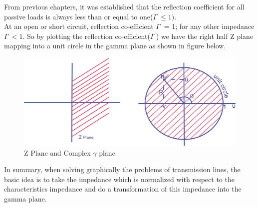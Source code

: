 From previous chapters, it was established that the reflection coefficient for all passive loads is always less than or equal to one($ \Gamma\ \leq 1).$\\
At an open or short circuit, reflection co-efficient $ \Gamma\ $ = 1; for any other impedance $ \Gamma\  < 1$.  So by plotting the reflection co-efficient($ \Gamma\ $) we have the right half Z plane mapping into a unit circle in the gamma plane as shown in figure below.
\begin{figure}[h]
\centering
\includegraphics[width=0.7\linewidth]{./graphics/oiuhgvcx}
\caption{Z Plane and Complex $\gamma$ plane}
\label{fig:oiuhgvcx}
\end{figure}

In summary, when solving graphically the problems of transmission lines, the basic idea is to take the impedance which is normalized with respect to the characteristics impedance and do a transformation of this impedance into the gamma plane.

